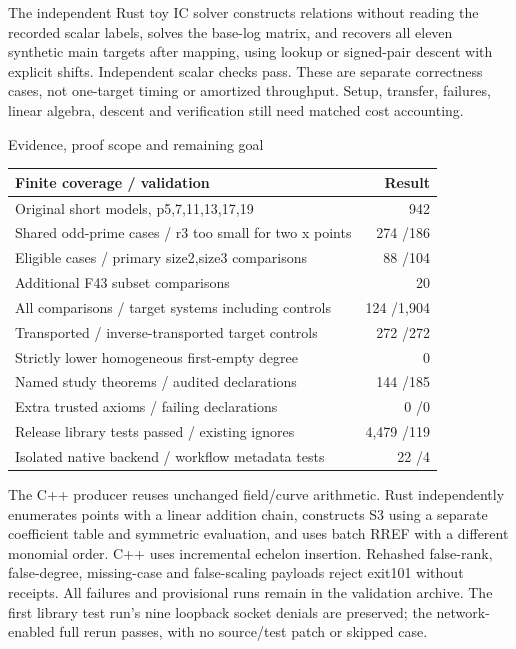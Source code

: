 \documentclass[10pt,a4paper]{article}
\begin{document}
The independent Rust toy IC solver constructs relations without reading the
recorded scalar labels, solves the base-log matrix, and recovers all eleven
synthetic main targets after mapping, using lookup or signed-pair descent with
explicit shifts. Independent scalar checks pass. These are separate correctness
cases, not one-target timing or amortized throughput. Setup, transfer, failures,
linear algebra, descent and verification still need matched cost accounting.

\newpage
{\Large Evidence, proof scope and remaining goal}

\begin{center}\small
\begin{tabular}{@{}p{92mm}r@{}}\toprule
Finite coverage / validation &Result\\\midrule
Original short models, p5,7,11,13,17,19 &942\\
Shared odd-prime cases / r3 too small for two x points &274 /186\\
Eligible cases / primary size2,size3 comparisons &88 /104\\
Additional F43 subset comparisons &20\\
All comparisons / target systems including controls &124 /1,904\\
Transported / inverse-transported target controls &272 /272\\
Strictly lower homogeneous first-empty degree &0\\
Named study theorems / audited declarations &144 /185\\
Extra trusted axioms / failing declarations &0 /0\\
Release library tests passed / existing ignores &4,479 /119\\
Isolated native backend / workflow metadata tests &22 /4\\\bottomrule
\end{tabular}\end{center}

The C++ producer reuses unchanged field/curve arithmetic. Rust independently
enumerates points with a linear addition chain, constructs S3 using a separate
coefficient table and symmetric evaluation, and uses batch RREF with a different
monomial order. C++ uses incremental echelon insertion. Rehashed false-rank,
false-degree, missing-case and false-scaling payloads reject exit101 without
receipts. All failures and provisional runs remain in the validation archive.
The first library test run's nine loopback socket denials are preserved; the
network-enabled full rerun passes, with no source/test patch or skipped case.
\end{document}
